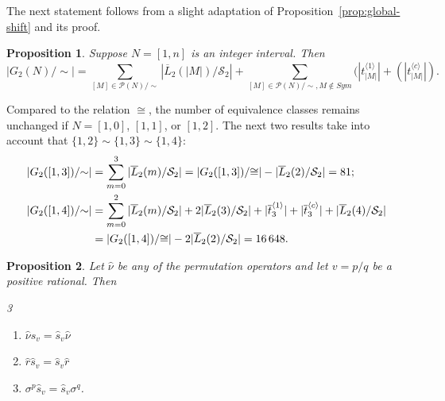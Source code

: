 \documentclass[a4paper]{article}
\newtheorem{prop}{Proposition}
\begin{document}
The next statement follows from a slight adaptation of Proposition~\ref{prop:global-shift} and its proof.
\begin{prop}
\label{prop:global-scaling}
Suppose $N = [1, n]$ is an integer interval. Then
\[
|G_2(N)/{\sim}| = \sum_{[M]\in \mathcal{P}(N)/{\sim}} |\overline{L}_2(|M|)/\mathcal{S}_2| +
      \sum_{[M]\in \mathcal{P}(N)/{\sim}, M \not\in Sym} (|t_{|M|}^{\langle 1 \rangle}| + (|t_{|M|}^{\langle c \rangle}|).
\]
\end{prop}
Compared to the relation $\cong$, the number of equivalence classes remains unchanged
if $N = [1,0]$, $[1,1]$, or $[1,2]$.
The next two results take into account that $\{1,2\} \sim \{1,3\} \sim \{1,4\} $:
\begin{align}
|G_2([1,3])/{\sim}| & = \sum_{m=0}^3 |\overline{L}_2(m) / \mathcal{S}_2| =
|G_2([1,3])/{\cong}| - |\overline{L}_2(2) / \mathcal{S}_2| = 81; \label{eq:classes81}  \\
|G_2([1,4])/{\sim}| & = \sum_{m=0}^2 |\overline{L}_2(m) / \mathcal{S}_2|
+ 2 |\overline{L}_2(3) / \mathcal{S}_2|
+ |\overline{t}^{\langle 1 \rangle}_3| + |\overline{t}^{\langle c \rangle}_3| +  |\overline{L}_2(4) / \mathcal{S}_2| \notag \\
& = |G_2([1,4])/{\cong}| - 2 |\overline{L}_2(2) / \mathcal{S}_2| = 16\,648 \notag.
\end{align}
\begin{prop}
\label{commutators}
Let $\hat{\nu}$ be any of the permutation operators and let $v=p/q$ be a positive rational. Then
\begin{multicols}{3}
    \begin{enumerate}[label=(\roman*)]
        \item \label{comm:pi-s} $\hat{\nu} \hat{s}_v = \hat{s}_v \hat{\nu}$
        \item \label{comm:r-s} $\hat{r} \hat{s}_v = \hat{s}_v \hat{r}$
        \item \label{comm:sigma-s} $\sigma^p \hat{s}_v = \hat{s}_v \sigma^q$.
    \end{enumerate}
    \end{multicols}
\end{prop}
\end{document}
